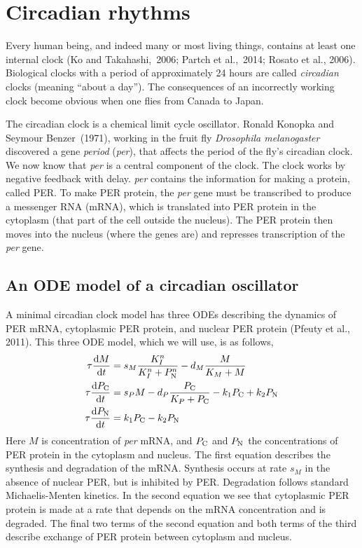 

\section{Circadian rhythms}
Every human being, and indeed many or most living things, contains at
least one internal clock (Ko and Takahashi,~2006; Partch et al.,~2014;
Rosato et al., 2006). Biological clocks with a period of 
approximately 24 hours are called \textit{circadian} clocks (meaning
``about a day''). The consequences of an incorrectly working clock
become obvious when one flies from Canada to Japan.

The circadian clock is a chemical limit cycle oscillator. Ronald
Konopka and Seymour Benzer~(1971), working in the fruit fly
\textit{Drosophila melanogaster} discovered a gene \textit{period}
(\textit{per}), that affects the period of the fly's circadian clock.
We now know that \textit{per} is a central component of the clock.
The clock works by negative feedback with delay. \textit{per}
contains the information for making a protein, called PER. To make
PER protein, the \textit{per} gene must be transcribed to produce a
messenger RNA (mRNA), which is translated into PER protein in the
cytoplasm (that part of the cell outside the nucleus). The PER
protein then moves into the nucleus (where the genes are) and
represses transcription of the \textit{per} gene. 

\subsection{An ODE model of a circadian oscillator}
A minimal circadian clock model has three ODEs describing the dynamics
of PER mRNA, cytoplasmic PER protein, and nuclear PER protein (Pfeuty
et al., 2011). This three ODE model, which we will use, is as
follows,
\begin{equation}\label{eq:Pfeutysystem}
\begin{aligned}
\tau\dv{M}{t}&={s}_{M}\frac{{K}_{I}^{n}}{{K}_{I}^{n}+P_{\text{N}}^{n}}-{d}_{M}\frac{M}{{K}_{M}+M}\\
\tau\dv{P_{\text{C}}}{t}&={s}_{P}M-{d}_{P}\frac{P_{\text{C}}}{{K}_{P}+P_{\text{C}}}-{k}_{1}P_{\text{C}}+{k}_{2}P_{\text{N}}\\
\tau \dv{P_{\text{N}}}{t}&={k}_{1}P_{\text{C}}-{k}_{2}P_{\text{N}}
\end{aligned}
\end{equation}
Here $M$ is concentration of \textit{per} mRNA, and $P_{\text{C}}$ and 
$P_{\text{N}}$ the concentrations of PER protein in the cytoplasm and
nucleus. The first equation describes the synthesis and degradation
of the mRNA. Synthesis occurs at rate ${s}_{M}$ in the absence of
nuclear PER, but is inhibited by PER. Degradation follows standard
Michaelis-Menten kinetics. In the second equation we see that
cytoplasmic PER protein is made at a rate that depends on the mRNA
concentration and is degraded. The final two terms of the second
equation and both terms of the third describe exchange of PER protein
between cytoplasm and nucleus. 


